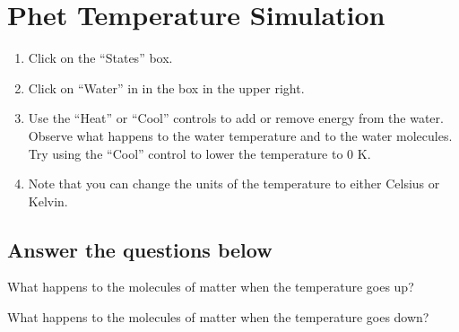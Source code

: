\documentclass[12pt]{exam}
\begin{document}
\section{Phet Temperature Simulation}

\begin{enumerate}
  \item Click on the “States” box.
  \item Click on “Water” in in the box in the upper right.
  \item Use the “Heat” or “Cool” controls to add or remove energy from the water. Observe what happens to the water temperature and to the water molecules. Try using the “Cool” control to lower the temperature to 0 K.
  \item Note that you can change the units of the temperature to either Celsius or Kelvin.
\end{enumerate}

\subsection{Answer the questions below}

\begin{questions}
  \question What happens to the molecules of matter when the temperature goes up?

  \vspace{3cm}

  \question What happens to the molecules of matter when the temperature goes down?
\end{questions}
\end{document}
